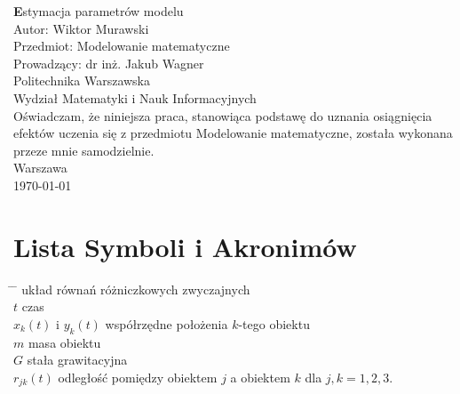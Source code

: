 \documentclass[a4paper, 12pt, twoside, openany]{article}
\date{\today}
\newcommand{\tytul}{Estymacja parametrów modelu}
\newcommand{\autor}{Wiktor Murawski}
\newcommand{\uczelnia}{Politechnika Warszawska}
\newcommand{\wydzial}{Wydział Matematyki i Nauk Informacyjnych}
\newcommand{\prowadzacy}{dr inż. Jakub Wagner}
\newcommand{\przedmiot}{Modelowanie matematyczne}
\newcommand{\miejsce}{Warszawa}
\begin{document}
	
	\begin{titlepage}
		\centering
		\vspace*{1cm}
		\LARGE\textbf \tytul \\
		\vspace{1.5cm}
		\large
		Autor: \autor \\
		\vspace{1cm}
		Przedmiot: \przedmiot \\
		Prowadzący: \prowadzacy \\
		\vspace{2cm}
		\uczelnia \\
		\wydzial \\
		\vspace{2cm}
		Oświadczam, że niniejsza praca, stanowiąca podstawę do uznania osiągnięcia efektów
		uczenia się z przedmiotu Modelowanie matematyczne, została wykonana przeze mnie samodzielnie.\\
		\vspace{2cm}
		\miejsce \\
		\today \\
	\end{titlepage}
	
	\tableofcontents
	\newpage
	
	\section{Lista Symboli i Akronimów}
	\begin{spacing}{1.5}
		\begin{tabbing}
			\hspace{5cm} \= \hspace{10cm} \= \kill
			 \> układ równań różniczkowych zwyczajnych \\
			$t$ \> czas \\
			$x_k(t)$ i $y_k(t)$ \> współrzędne położenia $k$-tego obiektu \\
			$m$ \> masa obiektu \\
			$G$ \> stała grawitacyjna \\
			$r_{jk}(t)$ \> odległość pomiędzy obiektem $j$ a obiektem $k$ dla $j,k = 1,2,3$.
		\end{tabbing}
	\end{spacing}
	\newpage
	
\end{document}
